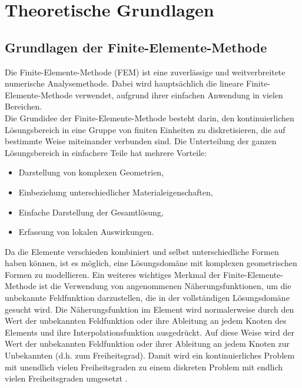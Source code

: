 	\pagestyle{fancy}
	
	\section{Theoretische Grundlagen} \label{sec:Theoretische Grundlagen}
	
	\subsection{Grundlagen der Finite-Elemente-Methode}\label{sec:Grundlagen-FEM}
	Die Finite-Elemente-Methode (FEM) ist eine zuverlässige und weitverbreitete numerische Analysemethode. Dabei wird hauptsächlich die lineare Finite-Elemente-Methode verwendet, aufgrund ihrer einfachen Anwendung in vielen Bereichen.\\
	
	Die Grundidee der Finite-Elemente-Methode besteht darin, den kontinuierlichen Lösungsbereich in eine Gruppe von finiten Einheiten zu diskretisieren, die auf bestimmte Weise miteinander verbunden sind. Die Unterteilung der ganzen Lösungsbereich in einfachere Teile hat mehrere Vorteile:
	\begin{itemize}
		\item Darstellung von komplexen Geometrien,
		\item Einbeziehung unterschiedlicher Materialeigenschaften,
		\item Einfache Darstellung der Gesamtlösung,
		\item Erfassung von lokalen Auswirkungen.
	\end{itemize}

	Da die Elemente verschieden kombiniert und selbst unterschiedliche Formen haben können, ist es möglich, eine Lösungsdomäne mit komplexen geometrischen Formen zu modellieren. Ein weiteres wichtiges Merkmal der Finite-Elemente-Methode ist die Verwendung von angenommenen Näherungsfunktionen, um die unbekannte Feldfunktion darzustellen, die in der vollständigen Lösungsdomäne gesucht wird. Die Näherungsfunktion im Element wird normalerweise durch den Wert der unbekannten Feldfunktion oder ihre Ableitung an jedem Knoten des Elements und ihre Interpolationsfunktion ausgedrückt. Auf diese Weise wird der Wert der unbekannten Feldfunktion oder ihrer Ableitung an jedem Knoten zur Unbekannten (d.h. zum Freiheitsgrad). Damit wird ein kontinuierliches Problem mit unendlich vielen Freiheitsgraden  zu einem diskreten Problem mit endlich vielen Freiheitsgraden umgesetzt \cite{schwarz2013methode}. \\
	
